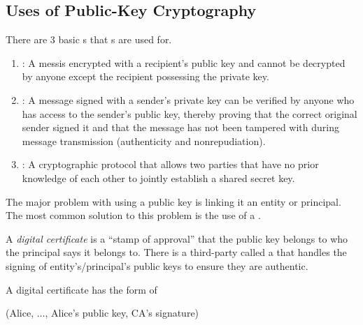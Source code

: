 \subsection{Uses of Public-Key Cryptography}\label{subsec:Uses_Public_Key_Cryptography}
There are 3 basic s that s are used for.
\begin{enumerate}[noitemsep]
\item {}: A messis encrypted with a recipient’s public key and cannot be decrypted by anyone except the recipient possessing the private key.
\item {}: A message signed with a sender’s private key can be verified by anyone who has access to the sender’s public key, thereby proving that the correct original sender signed it and that the message has not been tampered with during message transmission (authenticity and nonrepudiation).
\item {}: A cryptographic protocol that allows two parties that have no prior knowledge of each other to jointly establish a shared secret key.
\end{enumerate}

The major problem with using a public key is linking it an entity or principal.
The most common solution to this problem is the use of a .

\begin{definition}\label{def:Digital_Certificate}
  A \emph{digital certificate} is a ``stamp of approval'' that the public key belongs to who the principal says it belongs to.
  There is a third-party called a  that handles the signing of entity's/principal's public keys to ensure they are authentic.

  A digital certificate has the form of
  \begin{center}
    (Alice, $\ldots$, Alice's public key, CA's signature)
  \end{center}
\end{definition}

